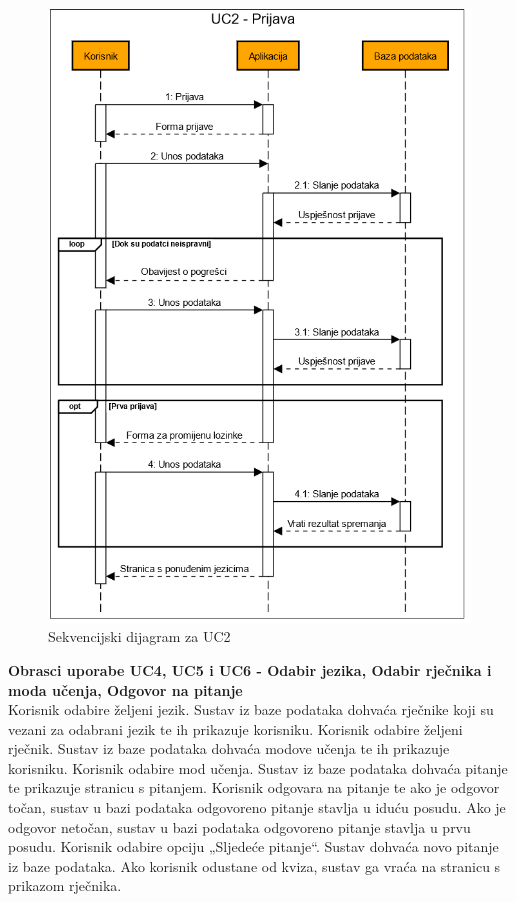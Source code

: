 				
				\begin{figure}[H]
					\includegraphics[width=\textwidth]{slike/UC2.PNG}
					\caption{Sekvencijski dijagram za UC2}
					\label{fig:sekv2}
				\end{figure} \newpage
								
				
				
				\noindent\textbf{Obrasci uporabe UC4, UC5 i UC6 - Odabir jezika, Odabir rječnika i moda učenja, Odgovor na pitanje}\\
				Korisnik odabire željeni jezik. Sustav iz baze podataka dohvaća rječnike koji su vezani za odabrani jezik te ih prikazuje korisniku. Korisnik odabire željeni rječnik. Sustav iz baze podataka dohvaća modove učenja te ih prikazuje korisniku. Korisnik odabire mod učenja. Sustav iz baze podataka dohvaća pitanje te prikazuje stranicu s pitanjem. Korisnik odgovara na pitanje te ako je odgovor točan, sustav u bazi podataka odgovoreno pitanje stavlja u iduću posudu. Ako je odgovor netočan, sustav u bazi podataka odgovoreno pitanje stavlja u prvu posudu. Korisnik odabire opciju „Sljedeće pitanje“. Sustav dohvaća novo pitanje iz baze podataka. Ako korisnik odustane od kviza, sustav ga vraća na stranicu s prikazom rječnika.
				
